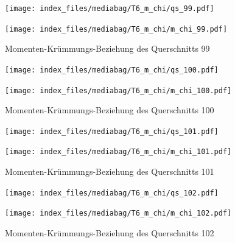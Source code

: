 \documentclass[
  11pt,
  letterpaper,
]{scrreprt}
\begin{document}
\begin{figure}[H]

\begin{minipage}{0.50\linewidth}
\texttt{[image: index\_files/mediabag/T6\_m\_chi/qs\_99.pdf]}\end{minipage}%
%
\begin{minipage}{0.50\linewidth}
\texttt{[image: index\_files/mediabag/T6\_m\_chi/m\_chi\_99.pdf]}\end{minipage}%

\caption{\label{fig-mchi_anhang}Momenten-Krümmungs-Beziehung des
Querschnitts 99}

\end{figure}%

\begin{figure}[H]

\begin{minipage}{0.50\linewidth}
\texttt{[image: index\_files/mediabag/T6\_m\_chi/qs\_100.pdf]}\end{minipage}%
%
\begin{minipage}{0.50\linewidth}
\texttt{[image: index\_files/mediabag/T6\_m\_chi/m\_chi\_100.pdf]}\end{minipage}%

\caption{\label{fig-mchi_anhang}Momenten-Krümmungs-Beziehung des
Querschnitts 100}

\end{figure}%

\begin{figure}[H]

\begin{minipage}{0.50\linewidth}
\texttt{[image: index\_files/mediabag/T6\_m\_chi/qs\_101.pdf]}\end{minipage}%
%
\begin{minipage}{0.50\linewidth}
\texttt{[image: index\_files/mediabag/T6\_m\_chi/m\_chi\_101.pdf]}\end{minipage}%

\caption{\label{fig-mchi_anhang}Momenten-Krümmungs-Beziehung des
Querschnitts 101}

\end{figure}%

\begin{figure}[H]

\begin{minipage}{0.50\linewidth}
\texttt{[image: index\_files/mediabag/T6\_m\_chi/qs\_102.pdf]}\end{minipage}%
%
\begin{minipage}{0.50\linewidth}
\texttt{[image: index\_files/mediabag/T6\_m\_chi/m\_chi\_102.pdf]}\end{minipage}%

\caption{\label{fig-mchi_anhang}Momenten-Krümmungs-Beziehung des
Querschnitts 102}

\end{figure}%
\end{document}
